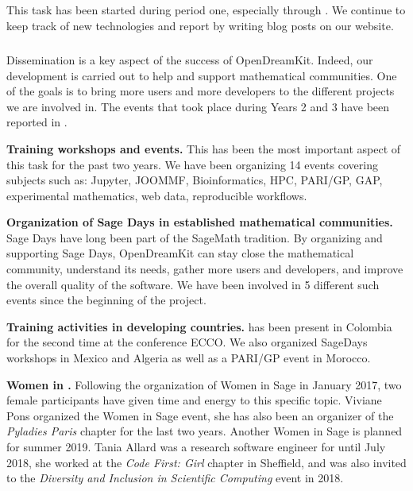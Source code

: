 \subparagraph{}

This task has been started during period one, especially through . We continue
to keep track of new technologies and report by writing blog posts on our website.


\subparagraph{}

Dissemination is a key aspect of the success of OpenDreamKit. Indeed, our development is carried
out to help and support mathematical communities. One of the goals is to bring
more users and more developers to the different projects we are involved in. The events
that took place during Years 2 and 3 have been reported in .

\begin{compactitem}
\item \textbf{Training workshops and events.} This has been the most important aspect of this task
for the past two years. We have been organizing 14 events covering subjects such as: Jupyter, JOOMMF,
Bioinformatics, HPC, PARI/GP, GAP, experimental mathematics, web data, reproducible workflows.
\item \textbf{Organization of Sage Days in established mathematical communities.} Sage Days have long been
part of the SageMath tradition. By organizing and supporting Sage Days, OpenDreamKit can stay close
the mathematical community, understand its needs, gather more users and developers, and improve
the overall quality of the software. We have been involved in 5 different such events since the beginning
of the project.
\item \textbf{Training activities in developing countries.} \ODK has been present in Colombia for the second time at
the conference ECCO. We also organized SageDays workshops in Mexico and Algeria as well as a PARI/GP event in Morocco.
\item \textbf{Women in \ODK.} Following the organization of Women in Sage in January 2017, two female \ODK participants
have given time and energy to this specific topic. Viviane Pons organized the Women in Sage event, she has also been 
an organizer of the \textit{Pyladies Paris} chapter for the last two years. Another Women in Sage is planned for summer 2019. Tania
Allard was a research software engineer for \ODK until July 2018, she worked at the \textit{Code First: Girl} chapter in
Sheffield, and was also invited to the \textit{Diversity and Inclusion in Scientific Computing} event in 2018.
\end{compactitem}

